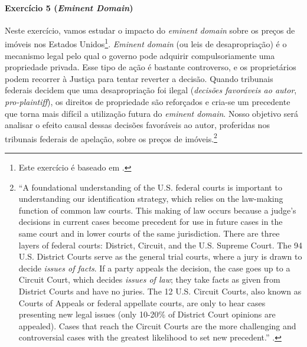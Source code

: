 \documentclass[10pt,a4paper]{article}
\begin{document}
\paragraph{Exercício 5 (\textit{Eminent Domain})} Neste exercício, vamos estudar o impacto do \emph{eminent domain} sobre os preços de imóveis nos Estados Unidos\footnote{Este exercício é baseado em \citet{chen2015growth}.}. \emph{Eminent domain} (ou leis de desapropriação) é o mecanismo legal pelo qual o governo pode adquirir compulsoriamente uma propriedade privada. Esse tipo de ação é bastante controverso, e os proprietários podem recorrer à Justiça para tentar reverter a decisão. Quando tribunais federais decidem que uma desapropriação foi ilegal (\emph{decisões favoráveis ao autor}, \emph{pro-plaintiff}), os direitos de propriedade são reforçados e cria-se um precedente que torna mais difícil a utilização futura do \emph{eminent domain}. Nosso objetivo será analisar o efeito causal dessas decisões favoráveis ao autor, proferidas nos tribunais federais de apelação, sobre os preços de imóveis.\footnote{``A foundational understanding of the U.S. federal courts is important to understanding our identification strategy, which relies on the law-making function of common law courts. This making of law occurs because a judge's decisions in current cases become precedent for use in future cases in the same court and in lower courts of the same jurisdiction. There are three layers of federal courts: District, Circuit, and the U.S. Supreme Court. The 94 U.S. District Courts serve as the general trial courts, where a jury is drawn to decide \emph{issues of facts}. If a party appeals the decision, the case goes up to a Circuit Court, which decides \emph{issues of law}; they take facts as given from District Courts and have no juries. The 12 U.S. Circuit Courts, also known as Courts of Appeals or federal appellate courts, are only to hear cases presenting new legal issues (only 10-20\% of District Court opinions are appealed). Cases that reach the Circuit Courts are the more challenging and controversial cases with the greatest likelihood to set new precedent.'' \citep[p. 11-12]{chen2015growth}.} 
\end{document}
